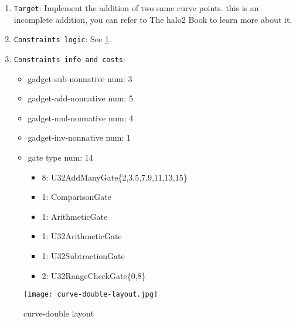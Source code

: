 
\begin{enumerate}
    \item \verb|Target|: Implement the addition of two same curve points. this is an incomplete addition, you can refer to The halo2 Book\cite{website:halo2-book} to learn more about it.
    \item \verb|Constraints logic|: See \ref{fig:curve-double-layout}.
    \item \verb|Constraints info and costs|:
    \begin{itemize}
        \item gadget-sub-nonnative num: 3
        \item gadget-add-nonnative num: 5
        \item gadget-mul-nonnative num: 4
        \item gadget-inv-nonnative num: 1
        \item gate type num: 14
            \begin{itemize}
                \item 8: U32AddManyGate\{2,3,5,7,9,11,13,15\}
                \item 1: ComparisonGate
                \item 1: ArithmeticGate
                \item 1: U32ArithmeticGate
                \item 1: U32SubtractionGate
                \item 2: U32RangeCheckGate\{0,8\}
            \end{itemize}
    \end{itemize}
\end{enumerate}

\begin{figure}[!ht]
    \centering
    \texttt{[image: curve-double-layout.jpg]}
    \caption{curve-double layout}
    \label{fig:curve-double-layout}
\end{figure}

